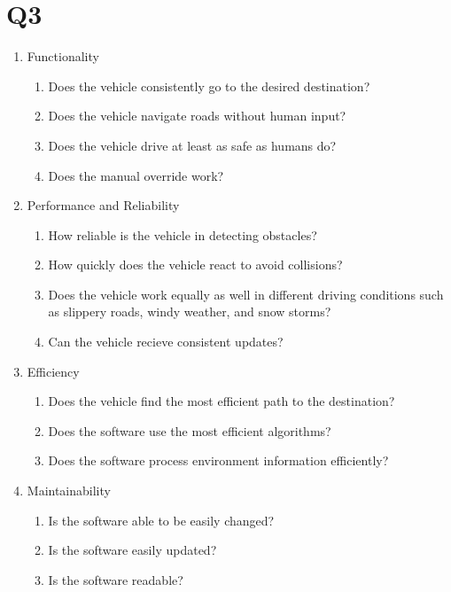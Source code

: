 \documentclass[12pt, letterpaper, titlepage]{article}
\begin{document}
    \section{Q3}
    \begin{enumerate}
        \item Functionality
            \begin{enumerate}
                \item Does the vehicle consistently go to the desired destination?
                \item Does the vehicle navigate roads without human input?
                \item Does the vehicle drive at least as safe as humans do?
                \item Does the manual override work?
            \end{enumerate}
        \item Performance and Reliability
            \begin{enumerate}
                \item How reliable is the vehicle in detecting obstacles?
                \item How quickly does the vehicle react to avoid collisions?
                \item Does the vehicle work equally as well in different driving conditions such as slippery roads, windy weather, and snow storms?
                \item Can the vehicle recieve consistent updates?
            \end{enumerate}
        \item Efficiency 
            \begin{enumerate}
                \item Does the vehicle find the most efficient path to the destination?
                \item Does the software use the most efficient algorithms?
                \item Does the software process environment information efficiently?
            \end{enumerate}
        \item Maintainability
            \begin{enumerate}
                \item Is the software able to be easily changed?
                \item Is the software easily updated?
                \item Is the software readable?

\end{enumerate}
\end{enumerate}
\end{document}
